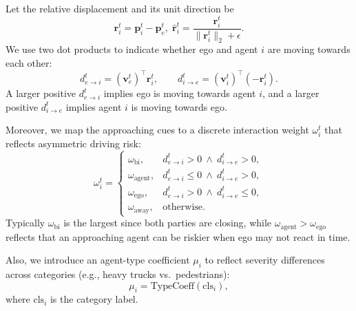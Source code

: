 \documentclass{article}
\begin{document}
Let the relative displacement and its unit direction be
\begin{equation}
\label{eq:rel_vec}
\mathbf{r}_i^t = \mathbf{p}_i^t - \mathbf{p}_e^t,\;
\hat{\mathbf{r}}_i^t = \frac{\mathbf{r}_i^t}{\lVert \mathbf{r}_i^t \rVert_2 + \epsilon}.
\end{equation}
We use two dot products to indicate whether ego and agent $i$ are moving towards each other:
\begin{equation}
\label{eq:dot_cues}
d_{e\rightarrow i}^t = (\mathbf{v}_e^t)^\top \mathbf{r}_i^t,
\qquad
d_{i\rightarrow e}^t = (\mathbf{v}_i^t)^\top (-\mathbf{r}_i^t).
\end{equation}
A larger positive $d_{e\rightarrow i}^t$ implies ego is moving towards agent $i$, and a larger positive
$d_{i\rightarrow e}^t$ implies agent $i$ is moving towards ego.

Moreover, we map the approaching cues to a discrete interaction weight $\omega_i^t$ that reflects asymmetric driving risk:
\begin{equation}
\label{eq:interaction}
\omega_i^t =
\begin{cases}
\omega_{\mathrm{bi}}, & d_{e\rightarrow i}^t>0~\wedge~ d_{i\rightarrow e}^t>0,\\
\omega_{\mathrm{agent}}, & d_{e\rightarrow i}^t\le 0~\wedge~ d_{i\rightarrow e}^t>0,\\
\omega_{\mathrm{ego}}, & d_{e\rightarrow i}^t>0~\wedge~ d_{i\rightarrow e}^t\le 0,\\
\omega_{\mathrm{away}}, & \text{otherwise}.
\end{cases}
\end{equation}
Typically $\omega_{\mathrm{bi}}$ is the largest since both parties are closing, while
$\omega_{\mathrm{agent}} > \omega_{\mathrm{ego}}$ reflects that an approaching agent can be riskier when ego may not react in time.

Also, we introduce an agent-type coefficient $\mu_i$ to reflect severity differences across categories
(e.g., heavy trucks vs.\ pedestrians):
\begin{equation}
\label{eq:mass_coeff}
\mu_i = \mathrm{TypeCoeff}(\mathrm{cls}_i),
\end{equation}
where $\mathrm{cls}_i$ is the category label.
\end{document}
